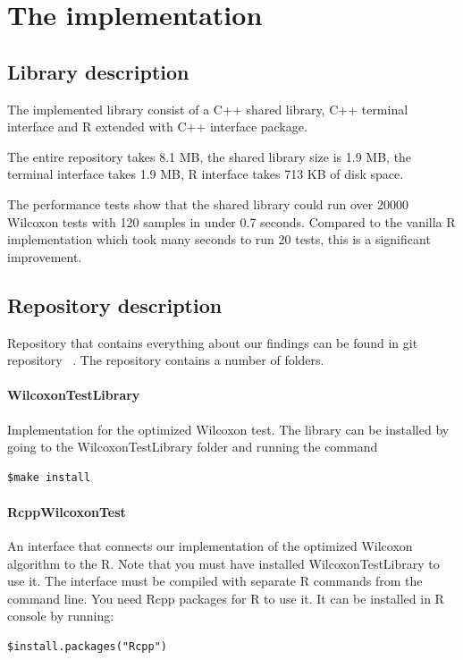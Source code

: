 \documentclass[12pt]{article}
\begin{document}
{\newpage

\section{The implementation}

\subsection{Library description}
The implemented library consist of a C++ shared library, C++ terminal interface and R extended with C++ interface package.

The entire repository takes 8.1 MB, the shared library size is 1.9 MB, the terminal interface takes 1.9 MB, R interface takes 713 KB of disk space.

The performance tests show that the shared library could run over 20000 Wilcoxon tests with 120 samples in under 0.7 seconds. Compared to the vanilla R implementation which took many seconds to run 20 tests, this is a significant improvement.

\subsection{Repository description}

Repository that contains everything about our findings can be found in git repository ~\cite{wilx_repo}. The repository contains a number of folders.

\paragraph{WilcoxonTestLibrary}
Implementation for the optimized Wilcoxon test. The library can be installed by going to the WilcoxonTestLibrary folder and running the command
\begin{lstlisting}
$make install
\end{lstlisting}

\paragraph{RcppWilcoxonTest}
An interface that connects our implementation of the optimized Wilcoxon algorithm to the R. Note that you must have installed WilcoxonTestLibrary to use it. The interface must be compiled with separate R commands from the command line. You need Rcpp packages for R to use it. It can be installed in R console by running:
\begin{lstlisting}
$install.packages("Rcpp")
\end{lstlisting}

}
\end{document}
